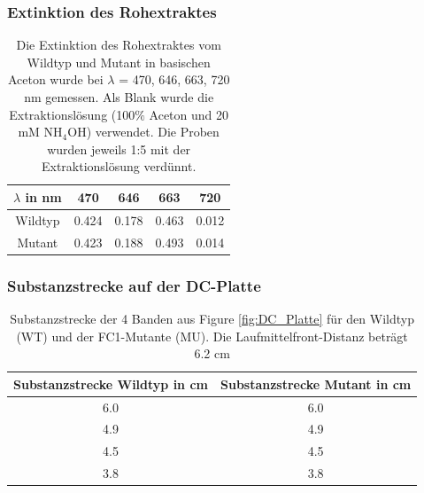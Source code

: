 \documentclass[10pt,a4paper]{article}
\begin{document}
			\subsubsection{Extinktion des Rohextraktes}
				\begin{table}[H]
					\centering
					\caption{Die Extinktion des Rohextraktes vom Wildtyp und Mutant in basischen Aceton wurde bei $\lambda$ = 470, 646, 663, 720 nm gemessen. Als Blank wurde die Extraktionslösung (100$\%$ Aceton und 20 mM NH$_4$OH) verwendet.
					Die Proben wurden jeweils 1:5 mit der Extraktionslösung verdünnt.}
					\label{tab:Rohdaten Extinktion Rohextraktes}
					\begin{tabular}{ccccc}
						\toprule
						$\lambda$ in nm &470& 646 & 663 & 720\\
						\midrule
						Wildtyp &0.424 & 0.178 & 0.463 & 0.012\\
						Mutant & 0.423 & 0.188 & 0.493 & 0.014 \\
						\bottomrule
					\end{tabular}
				\end{table}
			
			\subsubsection{Substanzstrecke auf der DC-Platte}
				\begin{table}[H]
					\centering
					\caption{Substanzstrecke der 4 Banden aus Figure \ref{fig:DC_Platte} für den Wildtyp (WT) und der FC1-Mutante (MU). Die Laufmittelfront-Distanz beträgt 6.2 cm}
					\label{tab:Distance_Rf_Werte_Banden_Rohwerte}
					\begin{tabular}{cc}
						\toprule
						Substanzstrecke Wildtyp in cm& Substanzstrecke Mutant in cm\\
						\midrule
						6.0 & 6.0 \\
						4.9 & 4.9\\
						4.5 & 4.5\\
						3.8 & 3.8\\
						\bottomrule
					\end{tabular}
				\end{table}


	
	\nocite{*}
	
	\newpage
	
\end{document}
